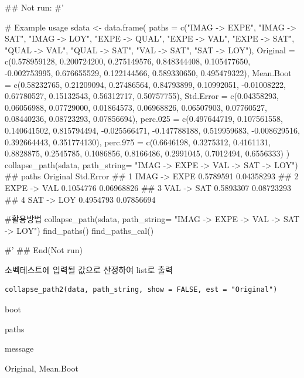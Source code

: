 \documentclass[a4paper]{book}
\begin{document}
%
\begin{Examples}
\begin{ExampleCode}


\#\# Not run: 
#'

# Example usage
sdata <- data.frame(
  paths = c("IMAG -> EXPE", "IMAG -> SAT", "IMAG -> LOY",
   "EXPE -> QUAL", "EXPE -> VAL", "EXPE -> SAT",
            "QUAL -> VAL", "QUAL -> SAT",
            "VAL -> SAT", "SAT -> LOY"),
  Original = c(0.578959128, 0.200724200, 0.275149576,
   0.848344408, 0.105477650, -0.002753995,
               0.676655529, 0.122144566, 0.589330650, 0.495479322),
  Mean.Boot = c(0.58232765, 0.21209094, 0.27486564,
  0.84793899, 0.10992051, -0.01008222,
                0.67780527, 0.15132543, 0.56312717, 0.50757755),
  Std.Error = c(0.04358293, 0.06056988, 0.07729000,
  0.01864573, 0.06968826, 0.06507903,
                0.07760527, 0.08440236, 0.08723293, 0.07856694),
  perc.025 = c(0.497644719, 0.107561558, 0.140641502,
   0.815794494, -0.025566471, -0.147788188,
               0.519959683, -0.008629516, 0.392664443, 0.351774130),
  perc.975 = c(0.6646198, 0.3275312, 0.4161131,
   0.8828875, 0.2545785, 0.1086856,
               0.8166486, 0.2991045, 0.7012494, 0.6556333)
)
collapse_path(sdata, path_string= "IMAG -> EXPE -> VAL -> SAT -> LOY")
## paths  Original  Std.Error
## 1 IMAG -> EXPE 0.5789591 0.04358293
## 2  EXPE -> VAL 0.1054776 0.06968826
## 3   VAL -> SAT 0.5893307 0.08723293
## 4   SAT -> LOY 0.4954793 0.07856694


#활용방법
collapse_path(sdata,
path_string= "IMAG -> EXPE -> VAL -> SAT -> LOY")%
find_paths()%
find_paths_cal()

#' 
## End(Not run)

\end{ExampleCode}
\end{Examples}
%
\begin{Description}
소벡테스트에 입력될 값으로 산정하여 list로 출력
\end{Description}
%
\begin{Usage}
\begin{verbatim}
collapse_path2(data, path_string, show = FALSE, est = "Original")
\end{verbatim}
\end{Usage}
%
\begin{Arguments}
\begin{ldescription}
\item[\code{data}] boot

\item[\code{path\_string}] paths

\item[\code{show}] message

\item[\code{est}] Original, Mean.Boot
\end{ldescription}
\end{Arguments}
\end{document}
